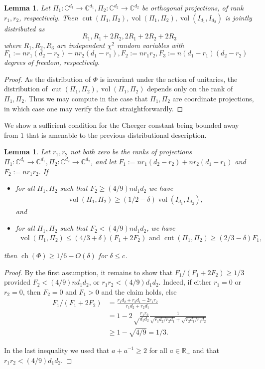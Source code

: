 \documentclass{article}
\newtheorem{lemma}[theorem]{Lemma}
\newcommand{\R}{{\mathbb{R}}}
\newcommand{\C}{{\mathbb{C}}}
\newcommand{\ch}{\operatorname{ch}}
\newcommand{\cut}{\operatorname{cut}}
\newcommand{\vol}{\operatorname{vol}}
\begin{document}
\begin{lemma}\label{fact:chi} Let $\Pi_1:\C^{d_1} \to \C^{d_1}, \Pi_2: \C^{d_2} \to \C^{d_2}$ be orthogonal projections, of rank $r_1, r_2$, respectively. Then $\cut(\Pi_1, \Pi_2), \vol(\Pi_1, \Pi_2), \vol(I_{d_1}, I_{d_2})$ is jointly distributed as
$$ R_1, R_1 + 2R_2, 2R_1 + 2 R_2 + 2R_3$$ where
$R_1, R_2, R_3$ are independent $\chi^2$ random variables with $F_1:=n r_1(d_2 - r_2) + n r_2(d_1-r_1), F_2:= n r_1r_2, F_3:= n(d_1 - r_1)(d_2 - r_2)$ degrees of freedom, respectively.
\end{lemma}
\begin{proof} As the distribution of $\Phi$ is invariant under the action of unitaries, the distribution of $\cut(\Pi_1, \Pi_2), \vol(\Pi_1, \Pi_2)$ depends only on the rank of $\Pi_1, \Pi_2$. Thus we may compute in the case that $\Pi_1, \Pi_2$ are coordinate projections, in which case one may verify the fact straightforwardly.
\end{proof}


 We show a sufficient condition for the Cheeger constant being bounded away from $1$ that is amenable to the previous distributional description.
\begin{lemma}\label{lem:suff}
Let $r_1, r_2$ not both zero be the ranks of projections $\Pi_1: \C^{d_1} \to \C^{d_1}, \Pi_2: \C^{d_2} \to \C^{d_2}$, and let $F_1:= n r_1(d_2 - r_2) + n r_2(d_1-r_1)$ and $F_2:=n r_1r_2.$ If
\begin{itemize}
\item for all $\Pi_1, \Pi_2$ such that $F_2 \geq (4/9) n d_1 d_2$ we have
\begin{gather}\vol(\Pi_1, \Pi_2) \geq (1/2 - \delta) \vol(I_{d_1}, I_{d_2}),\label{eq:vol}\end{gather} and
\item for all $\Pi_1, \Pi_2$ such that $F_2 < (4/9) n d_1 d_2$, we have
\begin{gather} \vol(\Pi_1, \Pi_2) \leq (4/3 + \delta)(F_1 + 2 F_2) \textrm{ and } \cut(\Pi_1, \Pi_2) \geq (2/3 - \delta) F_1,\label{eq:cut} \end{gather}
\end{itemize}
then $\ch(\Phi) \geq 1/6 - O(\delta)$ for $\delta \leq c$.
\end{lemma}
\begin{proof} By the first assumption, it remains to show that $F_1/(F_1 + 2 F_2) \geq 1/3$ provided $F_2 < (4/9) n d_1 d_2$, or $r_1 r_2 < (4/9) d_1 d_2$. Indeed, if either $r_1 = 0$ or $r_2 = 0$, then $F_2 = 0$ and $F_1>0$ and the claim holds, else
\begin{align*}F_1/(F_1 + 2 F_2) &= \frac{r_1 d_2 + r_2 d_1 - 2 r_1 r_2}{r_1 d_2 + r_2 d_1}\\
 &= 1 -2 \sqrt\frac{ r_1 r_2}{d_1 d_2} \frac{1}{ \sqrt{ r_1 d_2/r_2 d_1} + \sqrt{r_2 d_1/ r_1 d_2}} \\
 &\geq 1 - \sqrt{4/9} = 1/3.
\end{align*}

In the last inequality we used that $a + a^{-1} \geq 2$ for all $a \in \R_+$ and that $r_1 r_2 < (4/9) d_1 d_2$. \end{proof}
\end{document}
